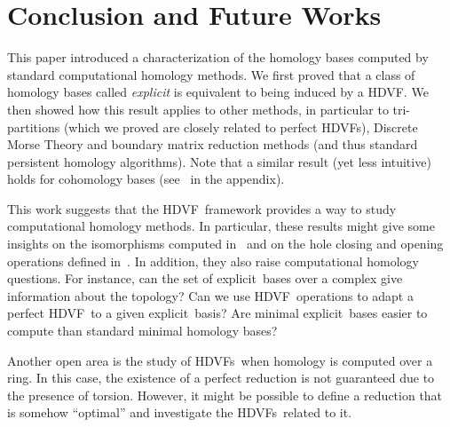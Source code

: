 \documentclass[runningheads]{llncs}
\let\Oldsection\section
\renewcommand{\section}{\FloatBarrier\Oldsection}
\newcommand{\explicit}{explicit}
\newcommand{\HC}{HDVF}
\newcommand{\HCs}{HDVFs}
\newcommand{\homcs}{homological discrete vector fields}
\newcommand{\REVIEW}[1]{{\color{red}$[$\textbf{REVIEW: }\textit{#1}$]$}}
\begin{document}
\section{Conclusion and Future Works}
    
    This paper introduced a characterization of the homology bases computed by standard computational homology methods.
    We first proved that a class of homology bases called \textit{explicit} is equivalent to being induced by a \HC.
    We then showed how this result applies to other methods, in particular to tri-partitions (which we proved are closely related to perfect \HCs), Discrete Morse Theory and boundary matrix reduction methods (and thus standard persistent homology algorithms).
    Note that a similar result (yet less intuitive) holds for cohomology bases (see~ in the appendix).

    This work suggests that the \HC\ framework provides a way to study computational homology methods.
    In particular, these results might give some insights on the isomorphisms computed in~\cite{aldo-constructive_alexander_duality} and on the hole closing and opening operations defined in~\cite{edelsbrunner-holes_dependences}.
    In addition, they also raise computational homology questions.
    For instance, can the set of \explicit\ bases over a complex give information about the topology? 
    Can we use \HC\ operations to adapt a perfect \HC\ to a given \explicit\ basis?
    Are minimal \explicit\ bases easier to compute than standard minimal homology bases?
    
    Another open area is the study of \HCs\ when homology is computed over a ring.
    In this case, the existence of a perfect reduction is not guaranteed due to the presence of torsion. However, it might be possible to define a reduction that is somehow ``optimal'' and investigate the \HCs\ related to it.
    
    
\end{document}
